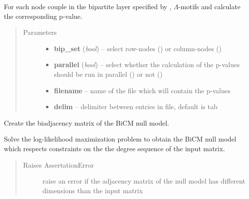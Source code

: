 \documentclass[letterpaper,10pt,english]{sphinxmanual}
\begin{document}
\begin{fulllineitems}
\begin{fulllineitems}
For each node couple in the bipartite layer specified by ,
\(\Lambda\)-motifs and calculate the corresponding p-value.
\begin{quote}\begin{description}
\item[{Parameters}] \leavevmode\begin{itemize}
\item {} 
\textbf{bip\_set} (\emph{bool}) -- select row-nodes () or column-nodes ()

\item {} 
\textbf{parallel} (\emph{bool}) -- select whether the calculation of the p-values should
be run in parallel () or not ()

\item {} 
\textbf{filename} -- name of the file which will contain the p-values

\item {} 
\textbf{delim} -- delimiter between entries in file, default is tab

\end{itemize}

\end{description}\end{quote}

\end{fulllineitems}


\begin{fulllineitems}
\label{source/src:src.bicm.BiCM.make_bicm}
Create the biadjacency matrix of the BiCM null model.

Solve the log-likelihood maximization problem to obtain the BiCM
null model which respects constraints on the the degree sequence of the
input matrix.
\begin{quote}\begin{description}
\item[{Raises AssertationError}] \leavevmode
raise an error if the adjacency matrix of the
null model has different dimensions than the input matrix

\end{description}\end{quote}

\end{fulllineitems}



\end{fulllineitems}
\end{document}
